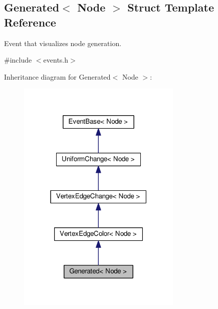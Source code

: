 \hypertarget{structGenerated}{}\subsection{Generated$<$ Node $>$ Struct Template Reference}
\label{structGenerated}


Event that visualizes node generation.  




{\ttfamily \#include $<$events.\+h$>$}



Inheritance diagram for Generated$<$ Node $>$\+:\nopagebreak
\begin{figure}[H]
\begin{center}
\leavevmode
\includegraphics[width=223pt]{structGenerated__inherit__graph}
\end{center}
\end{figure}


